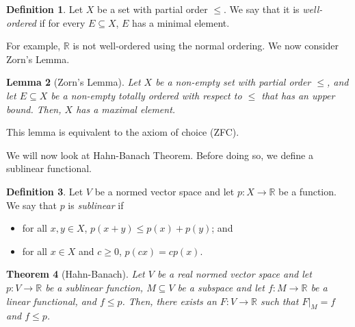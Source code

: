 \documentclass[a4paper, openany]{memoir}
\theoremstyle{definition}
\newtheorem{definition}{Definition}[section]
\theoremstyle{plain}
\newtheorem{theorem}[definition]{Theorem}
\newtheorem{lemma}[definition]{Lemma}
\begin{document}
    \begin{definition}
        Let $X$ be a set with partial order $\leq$. We say that it is \emph{well-ordered} if for every $E \subseteq X$, $E$ has a minimal element.
    \end{definition}
    \noindent For example, $\mathbb{R}$ is not well-ordered using the normal ordering. We now consider Zorn's Lemma.
    \begin{lemma}[Zorn's Lemma]
        Let $X$ be a non-empty set with partial order $\leq$, and let $E \subseteq X$ be a non-empty totally ordered with respect to $\leq$ that has an upper bound. Then, $X$ has a maximal element.
    \end{lemma}
    \noindent This lemma is equivalent to the axiom of choice (ZFC).

    We will now look at Hahn-Banach Theorem. Before doing so, we define a sublinear functional.
    \begin{definition}
        Let $V$ be a normed vector space and let $p \colon X \to \mathbb{R}$ be a function. We say that $p$ is \emph{sublinear} if 
        \begin{itemize}
            \item for all $x, y \in X$, $p(x + y) \leq p(x) + p(y)$; and 
            \item for all $x \in X$ and $c \geq 0$, $p(cx) = cp(x)$.
        \end{itemize}
    \end{definition}
    \begin{theorem}[Hahn-Banach]
        Let $V$ be a real normed vector space and let $p \colon V \to \mathbb{R}$ be a sublinear function, $M \subseteq V$ be a subspace and let $f \colon M \to \mathbb{R}$ be a linear functional, and $f \leq p$. Then, there exists an $F \colon V \to \mathbb{R}$ such that $F|_M = f$ and $f \leq p$.
    \end{theorem}
\end{document}
